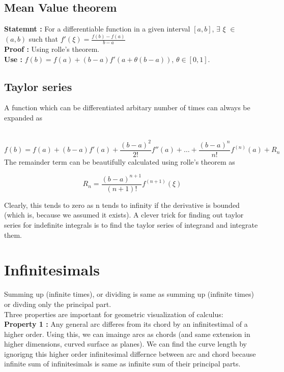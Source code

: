\documentclass{report}
\begin{document}
\subsection{Mean Value theorem}
\textbf{Statemnt :} For a differentiable function in a given interval $[a,b]$, $\exists$ $\xi$ $\in$ $(a,b)$ such that $f'(\xi) = \frac{f(b)-f(a)}{b-a}$ \\

\noindent\textbf{Proof :} Using rolle's theorem.\\

\noindent\textbf{Use :} $f(b) = f(a) + (b-a) f'(a+\theta (b-a))$, $\theta \in [0,1]$.

\subsection{Taylor series}
A function which can be differentiated arbitary number of times can always be expanded as \\\

\begin{equation}
f(b) = f(a) + (b-a)f'(a) + \frac{(b-a)^2}{2!}f''(a) + \dots + \frac{(b-a)^n}{n!}f^{(n)}(a) + R_n
\end{equation}
The remainder term can be beautifully calculated using rolle's theorem as 

$$R_n = \frac{(b-a)^{n+1}}{(n+1)!} f^{(n+1)}(\xi)$$

\noindent Clearly, this tends to zero as n tends to infinity if the derivative is bounded (which is, because we assumed it exists). A clever trick for finding out taylor series for indefinite integrals is to find the taylor series of integrand and integrate them.

\section{Infinitesimals}
Summing up (infinite times), or dividing is same as summing up (infinite times) or divding only the principal part.\\

\noindent Three properties are important for geometric visualization of calculus:\\

\noindent \textbf{Property 1 :} Any general arc differes from its chord by an infinitestimal of a higher order. Using this, we can imainge arcs as chords (and same extension in higher dimensions, curved surface as planes). We can find the curve length by ignorigng this higher order infinitesimal differnce between arc and chord because infinite sum of infinitesimals is same as infinite sum of their principal parts.\\
\end{document}
